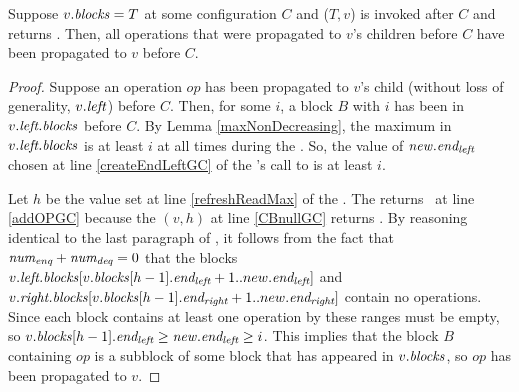 \begin{lemma}\label{nullRefreshGC}
Suppose $v.\mbox{\textit{blocks}}=T$ at some configuration $C$ and ($T,v$) is invoked after $C$ and
returns \nl.  Then, all operations that were propagated to $v$'s
children before $C$ have been propagated to $v$ before $C$.
\end{lemma}
\begin{proof}
Suppose an operation $op$ has been propagated to $v$'s child (without loss of generality, $v.\mbox{\textit{left}}$) before $C$.
Then, for some $i$, a block $B$ with  $i$ has been in $v.\mbox{\textit{left.blocks}}$ before $C$.
By Lemma \ref{maxNonDecreasing}, 
the maximum  in $v.\mbox{\textit{left.blocks}}$ is at least $i$ at all times during the .
So, the value of $\mbox{\textnormal{\textit{new}}}.\mbox{\textit{end\textsubscript{left}}}$ chosen at line \ref{createEndLeftGC} of the 's call
to  is at least $i$.

Let $h$ be the value set at line \ref{refreshReadMax} of the .
The  returns \nl\ at line \ref{addOPGC}
because the $(v,h)$  at line \ref{CBnullGC} returns \nl.
By reasoning identical to the last paragraph of ,
it follows from the fact that $\mbox{\textnormal{\textit{num\textsubscript{enq}}}}+\mbox{\textnormal{\textit{num\textsubscript{deq}}}}=0$ that
the blocks $v.\mbox{\textit{left.blocks}}[v.\mbox{\textit{blocks}}[h-1].\mbox{\textit{end\textsubscript{left}}}+1..new.\mbox{\textit{end\textsubscript{left}}}]$ and
$v.\mbox{\textit{right.blocks}}[v.\mbox{\textit{blocks}}[h-1].\mbox{\textit{end\textsubscript{right}}}+1..new.\mbox{\textit{end\textsubscript{right}}}]$
contain no operations.
Since each block contains at least one operation by 
these ranges must be empty, so $v.\mbox{\textit{blocks}}[h-1].\mbox{\textit{end\textsubscript{left}}} \geq \mbox{\textnormal{\textit{new}}}.\mbox{\textit{end\textsubscript{left}}}\geq i$.
This implies that the block $B$ containing $op$ is a subblock of some block that has appeared in $v.\mbox{\textit{blocks}}$, so $op$ has been propagated to $v$.
\end{proof}

